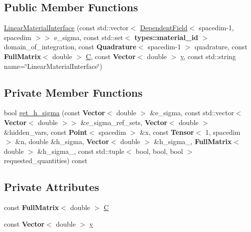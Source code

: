 \subsection*{Public Member Functions}
\begin{DoxyCompactItemize}
\item 
\hyperlink{class_linear_material_interface_ac10a5c148dd81edab41d22dd207c78a2}{Linear\+Material\+Interface} (const std\+::vector$<$ \hyperlink{class_dependent_field}{Dependent\+Field}$<$ spacedim-\/1, spacedim $>$$>$ e\+\_\+sigma, const std\+::set$<$ {\bf types\+::material\+\_\+id} $>$ domain\+\_\+of\+\_\+integration, const {\bf Quadrature}$<$ spacedim-\/1 $>$ quadrature, const {\bf Full\+Matrix}$<$ double $>$ \hyperlink{class_linear_material_interface_ae0b1ef211453e5fd3e1416ff37c315db}{C}, const {\bf Vector}$<$ double $>$ \hyperlink{class_linear_material_interface_a3864513d7662e4d1c91e606467befd59}{y}, const std\+::string name=\char`\"{}Linear\+Material\+Interface\char`\"{})
\end{DoxyCompactItemize}
\subsection*{Private Member Functions}
\begin{DoxyCompactItemize}
\item 
bool \hyperlink{class_linear_material_interface_a5c7730aa5b8b175950ba6ce670419450}{get\+\_\+h\+\_\+sigma} (const {\bf Vector}$<$ double $>$ \&e\+\_\+sigma, const std\+::vector$<$ {\bf Vector}$<$ double $>$$>$ \&e\+\_\+sigma\+\_\+ref\+\_\+sets, {\bf Vector}$<$ double $>$ \&hidden\+\_\+vars, const {\bf Point}$<$ spacedim $>$ \&x, const {\bf Tensor}$<$ 1, spacedim $>$ \&n, double \&h\+\_\+sigma, {\bf Vector}$<$ double $>$ \&h\+\_\+sigma\+\_, {\bf Full\+Matrix}$<$ double $>$ \&h\+\_\+sigma\+\_, const std\+::tuple$<$ bool, bool, bool $>$ requested\+\_\+quantities) const 
\end{DoxyCompactItemize}
\subsection*{Private Attributes}
\begin{DoxyCompactItemize}
\item 
const {\bf Full\+Matrix}$<$ double $>$ \hyperlink{class_linear_material_interface_ae0b1ef211453e5fd3e1416ff37c315db}{C}
\item 
const {\bf Vector}$<$ double $>$ \hyperlink{class_linear_material_interface_a3864513d7662e4d1c91e606467befd59}{y}
\end{DoxyCompactItemize}


